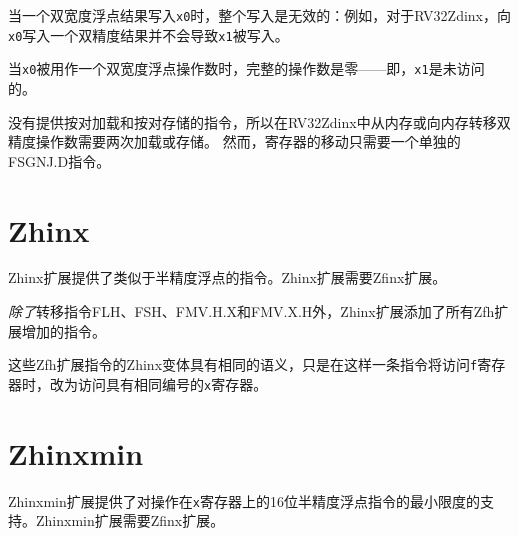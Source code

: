 当一个双宽度浮点结果写入{\tt x0}时，整个写入是无效的：例如，对于RV32Zdinx，向{\tt x0}写入一个双精度结果并不会导致{\tt x1}被写入。

当{\tt x0}被用作一个双宽度浮点操作数时，完整的操作数是零——即，{\tt x1}是未访问的。

\begin{commentary}
没有提供按对加载和按对存储的指令，所以在RV32Zdinx中从内存或向内存转移双精度操作数需要两次加载或存储。
然而，寄存器的移动只需要一个单独的FSGNJ.D指令。
\end{commentary}

\section{Zhinx}

Zhinx扩展提供了类似于半精度浮点的指令。Zhinx扩展需要Zfinx扩展。

{\em 除了}转移指令FLH、FSH、FMV.H.X和FMV.X.H外，Zhinx扩展添加了所有Zfh扩展增加的指令。

这些Zfh扩展指令的Zhinx变体具有相同的语义，只是在这样一条指令将访问{\tt f}寄存器时，改为访问具有相同编号的{\tt x}寄存器。

\section{Zhinxmin}

Zhinxmin扩展提供了对操作在{\tt x}寄存器上的16位半精度浮点指令的最小限度的支持。Zhinxmin扩展需要Zfinx扩展。

